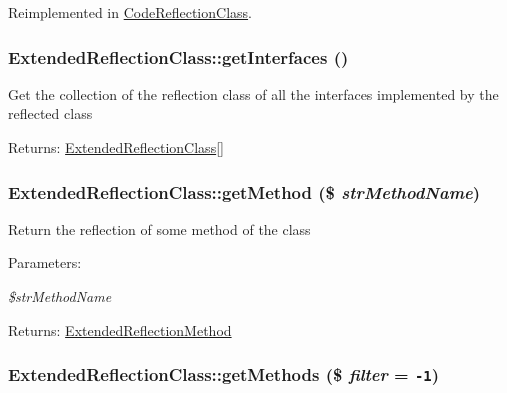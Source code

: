 Reimplemented in \hyperlink{class_code_reflection_class_838dcd22317018c53f02dda69cd07509}{CodeReflectionClass}.\hypertarget{class_extended_reflection_class_bd1fa7af7876ada7e09c2d4727201b45}{
\subsubsection[{getInterfaces}]{\setlength{\rightskip}{0pt plus 5cm}ExtendedReflectionClass::getInterfaces ()}}
\label{class_extended_reflection_class_bd1fa7af7876ada7e09c2d4727201b45}


Get the collection of the reflection class of all the interfaces implemented by the reflected class

\begin{Desc}
\item[Returns:]\hyperlink{class_extended_reflection_class}{ExtendedReflectionClass}\mbox{[}\mbox{]} \end{Desc}
\hypertarget{class_extended_reflection_class_87cabc3e5bca9750380f3c06cc613d0a}{
\subsubsection[{getMethod}]{\setlength{\rightskip}{0pt plus 5cm}ExtendedReflectionClass::getMethod (\$ {\em strMethodName})}}
\label{class_extended_reflection_class_87cabc3e5bca9750380f3c06cc613d0a}


Return the reflection of some method of the class

\begin{Desc}
\item[Parameters:]
\begin{description}
\item[{\em \$strMethodName}]\end{description}
\end{Desc}
\begin{Desc}
\item[Returns:]\hyperlink{class_extended_reflection_method}{ExtendedReflectionMethod} \end{Desc}
\hypertarget{class_extended_reflection_class_01f8e033ec5d82ae20394345fcb06841}{
\subsubsection[{getMethods}]{\setlength{\rightskip}{0pt plus 5cm}ExtendedReflectionClass::getMethods (\$ {\em filter} = {\tt -1})}}
\label{class_extended_reflection_class_01f8e033ec5d82ae20394345fcb06841}


